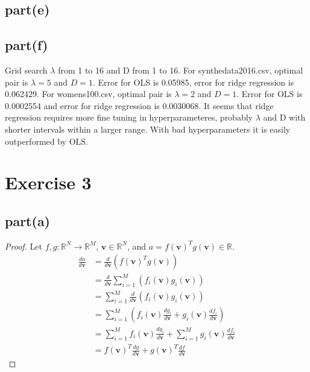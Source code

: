 \documentclass[12pt]{amsart}
\newcommand{\vect}[1]{\mathbf{#1}}
\begin{document}
\subsection*{part(e)}

\subsection*{part(f)}
Grid search $\lambda$ from 1 to 16 and D from 1 to 16. For synthedata2016.csv, optimal pair is $\lambda = 5$ and $D=1$. Error for OLS is 0.05985, error for ridge regression is 0.062429. For womens100.csv, optimal pair is $\lambda = 2$ and $D=1$. Error for OLS is 0.0002554 and error for ridge regression is 0.0030068. It seems that ridge regression requires more fine tuning in hyperparameteres, probably $\lambda$ and D with shorter intervals within a larger range. With bad hyperparameters it is easily outperformed by OLS.

\newpage

\section*{Exercise 3}
\subsection*{part(a)}
\begin{proof}
Let $f,g:\mathbb{R}^N\to\mathbb{R}^M$,  $\vect{v}\in\mathbb{R}^N$, and $a = f(\vect{v})^T g(\vect{v})\in \mathbb{R}$.
\begin{align*}
    \frac{da}{d\vect{v}} &= \frac{d}{d\vect{v}}(f(\vect{v})^T g(\vect{v}))\\
    &= \frac{d}{d\vect{v}} \sum_{i=1}^M (f_i(\vect{v})g_i(\vect{v}))\\
    &= \sum_{i=1}^M \frac{d}{d\vect{v}}(f_i(\vect{v})g_i(\vect{v}))\\
    &= \sum_{i=1}^M (f_i(\vect{v})\frac{dg_i}{d\vect{v}}+g_i(\vect{v})\frac{df_i}{d\vect{v}})\\
    &= \sum_{i=1}^M f_i(\vect{v})\frac{dg_i}{d\vect{v}} +\sum_{i=1}^M g_i(\vect{v})\frac{df_i}{d\vect{v}}\\
    &= f(\vect{v})^T\frac{dg}{d\vect{v}} +g(\vect{v})^T\frac{df}{d\vect{v}}
\end{align*}
\end{proof}
\end{document}

